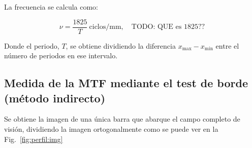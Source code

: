 \documentclass{./packages/optica-article}
\begin{document}
La frecuencia se calcula como:

\begin{equation}
	\nu = \frac{1825}{T}\ \textrm{ciclos/mm},\quad\textrm{TODO: QUE es 1825??}
	\label{eq:frecuencia}
\end{equation}

Donde el periodo, $T$, se obtiene dividiendo la diferencia $x_{\max} - x_{\min}$ entre el número de periodos en ese intervalo.

\subsection{Medida de la MTF mediante el test de borde (método indirecto)}\label{sec:description:indirecto}

Se obtiene la imagen de una única barra que abarque el campo completo de visión, dividiendo la imagen ortogonalmente como se puede ver en la Fig.~\ref{fig:perfil:img}
\end{document}
